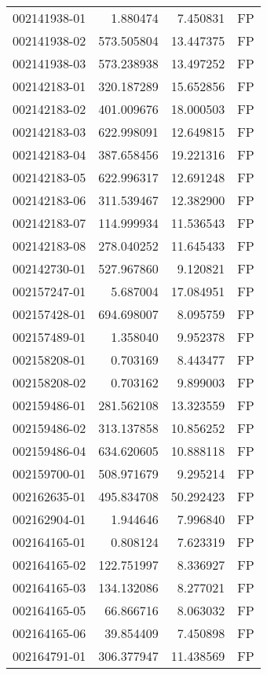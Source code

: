 \begin{tabular}{lrrl}
002141938-01 &    1.880474 &     7.450831 &   FP \\
002141938-02 &  573.505804 &    13.447375 &   FP \\
002141938-03 &  573.238938 &    13.497252 &   FP \\
002142183-01 &  320.187289 &    15.652856 &   FP \\
002142183-02 &  401.009676 &    18.000503 &   FP \\
002142183-03 &  622.998091 &    12.649815 &   FP \\
002142183-04 &  387.658456 &    19.221316 &   FP \\
002142183-05 &  622.996317 &    12.691248 &   FP \\
002142183-06 &  311.539467 &    12.382900 &   FP \\
002142183-07 &  114.999934 &    11.536543 &   FP \\
002142183-08 &  278.040252 &    11.645433 &   FP \\
002142730-01 &  527.967860 &     9.120821 &   FP \\
002157247-01 &    5.687004 &    17.084951 &   FP \\
002157428-01 &  694.698007 &     8.095759 &   FP \\
002157489-01 &    1.358040 &     9.952378 &   FP \\
002158208-01 &    0.703169 &     8.443477 &   FP \\
002158208-02 &    0.703162 &     9.899003 &   FP \\
002159486-01 &  281.562108 &    13.323559 &   FP \\
002159486-02 &  313.137858 &    10.856252 &   FP \\
002159486-04 &  634.620605 &    10.888118 &   FP \\
002159700-01 &  508.971679 &     9.295214 &   FP \\
002162635-01 &  495.834708 &    50.292423 &   FP \\
002162904-01 &    1.944646 &     7.996840 &   FP \\
002164165-01 &    0.808124 &     7.623319 &   FP \\
002164165-02 &  122.751997 &     8.336927 &   FP \\
002164165-03 &  134.132086 &     8.277021 &   FP \\
002164165-05 &   66.866716 &     8.063032 &   FP \\
002164165-06 &   39.854409 &     7.450898 &   FP \\
002164791-01 &  306.377947 &    11.438569 &   FP \\

\end{tabular}
